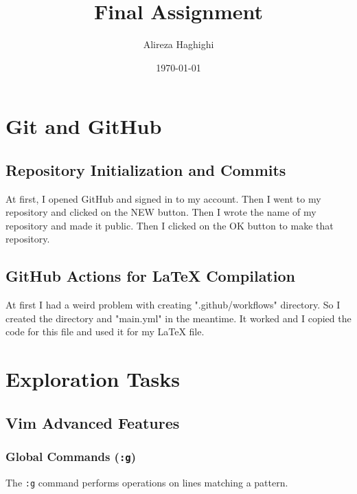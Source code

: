 \documentclass{article}
\title{Final Assignment}
\author{Alireza Haghighi}
\date{\today}
\begin{document}
\begin{titlepage}
    \maketitle
    \thispagestyle{empty}
\end{titlepage}

\newpage
\tableofcontents
\thispagestyle{empty}

\newpage

\section{Git and GitHub}
\subsection{Repository Initialization and Commits}
At first, I opened GitHub and signed in to my account. Then I went to my repository and clicked on the NEW button. Then I wrote the name of my repository and made it public. Then I clicked on the OK button to make that repository.

\subsection{GitHub Actions for LaTeX Compilation}
At first I had a weird problem with creating ".github/workflows" directory. So I created the directory and "main.yml" in the meantime. It worked and I copied the code for this file and used it for my LaTeX file.

\section{Exploration Tasks}
\subsection{Vim Advanced Features}
\subsubsection{Global Commands (\texttt{:g})}
The \texttt{:g} command performs operations on lines matching a pattern.
\end{document}
